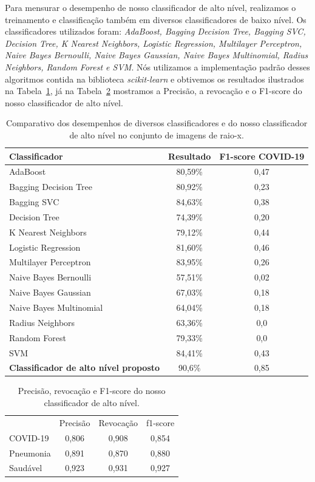 \documentclass[
12pt,        %
oneside,     %
a4paper,     %
english,       %
brazil        %
%
%
]{ppgca}
\begin{document}
Para mensurar o desempenho de nosso classificador de alto nível, realizamos o treinamento e classificação também em diversos classificadores de baixo nível. Os classificadores utilizados foram: \textit{AdaBoost, Bagging Decision Tree, Bagging SVC, Decision Tree, K Nearest Neighbors, Logistic Regression, Multilayer Perceptron, Naive Bayes Bernoulli, Naive Bayes Gaussian, Naive Bayes Multinomial, Radius Neighbors, Random Forest e SVM}. Nós utilizamos a implementação padrão desses algoritmos contida na biblioteca \textit{scikit-learn} \cite{scikit-learn} e obtivemos os resultados ilustrados na Tabela~\ref{tab:resultado}, já na Tabela~\ref{tab:resultadoreport} mostramos a Precisão, a revocação e o F1-score do nosso classificador de alto nível.

\begin{table}[h]
\caption{Comparativo dos desempenhos de diversos classificadores e do nosso classificador de alto nível no conjunto de imagens de raio-x.}
\label{tab:resultado}
  \centering
\begin{tabular}{l|c|c}\hline
 Classificador & Resultado & F1-score COVID-19\\\hline
AdaBoost & 80,59\% & 0,47\\
Bagging Decision Tree & 80,92\% & 0,23\\
Bagging SVC & 84,63\% & 0,38\\
Decision Tree & 74,39\% & 0,20\\
K Nearest Neighbors & 79,12\% & 0,44\\
Logistic Regression & 81,60\% & 0,46\\
Multilayer Perceptron & 83,95\% & 0,26\\
Naive Bayes Bernoulli & 57,51\% & 0,02\\
Naive Bayes Gaussian & 67,03\% & 0,18\\
Naive Bayes Multinomial & 64,04\% & 0,18\\
Radius Neighbors & 63,36\% & 0,0\\
Random Forest & 79,33\% & 0,0\\
SVM & 84,41\% & 0,43\\
\textbf{Classificador de alto nível proposto} & 90,6\% & 0,85\\\hline
\end{tabular}
\end{table}

\begin{table}[h]
\caption{Precisão, revocação e F1-score do nosso classificador de alto nível.}
\label{tab:resultadoreport}
  \centering
\begin{tabular}{l|c|c|c}\hline
& Precisão & Revocação & f1-score\\
COVID-19 & 0,806 & 0,908 & 0,854\\
Pneumonia & 0,891 & 0,870 & 0,880\\
Saudável & 0,923 & 0,931 & 0,927\\\hline
\end{tabular}
\end{table}
\end{document}
